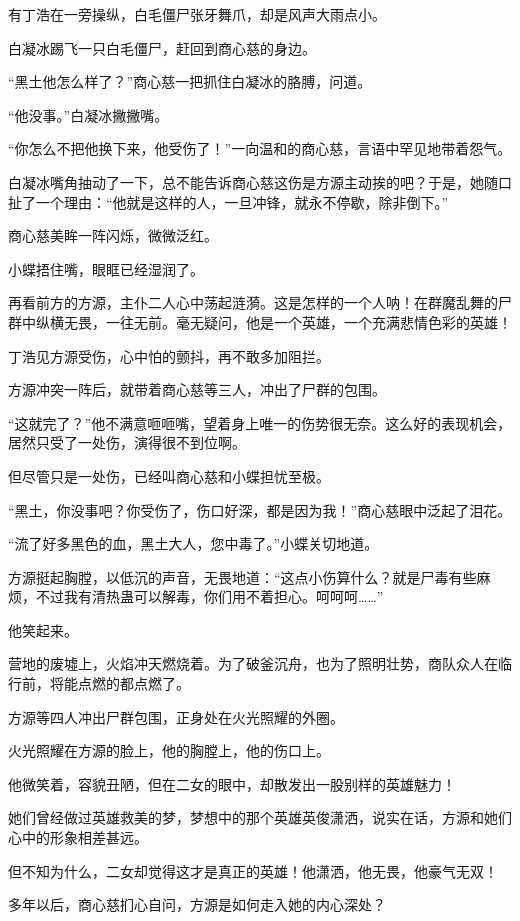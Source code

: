 \begin{this_body}
有丁浩在一旁操纵，白毛僵尸张牙舞爪，却是风声大雨点小。

白凝冰踢飞一只白毛僵尸，赶回到商心慈的身边。

“黑土他怎么样了？”商心慈一把抓住白凝冰的胳膊，问道。

“他没事。”白凝冰撇撇嘴。

“你怎么不把他换下来，他受伤了！”一向温和的商心慈，言语中罕见地带着怨气。

白凝冰嘴角抽动了一下，总不能告诉商心慈这伤是方源主动挨的吧？于是，她随口扯了一个理由：“他就是这样的人，一旦冲锋，就永不停歇，除非倒下。”

商心慈美眸一阵闪烁，微微泛红。

小蝶捂住嘴，眼眶已经湿润了。

再看前方的方源，主仆二人心中荡起涟漪。这是怎样的一个人呐！在群魔乱舞的尸群中纵横无畏，一往无前。毫无疑问，他是一个英雄，一个充满悲情色彩的英雄！

丁浩见方源受伤，心中怕的颤抖，再不敢多加阻拦。

方源冲突一阵后，就带着商心慈等三人，冲出了尸群的包围。

“这就完了？”他不满意咂咂嘴，望着身上唯一的伤势很无奈。这么好的表现机会，居然只受了一处伤，演得很不到位啊。

但尽管只是一处伤，已经叫商心慈和小蝶担忧至极。

“黑土，你没事吧？你受伤了，伤口好深，都是因为我！”商心慈眼中泛起了泪花。

“流了好多黑色的血，黑土大人，您中毒了。”小蝶关切地道。

方源挺起胸膛，以低沉的声音，无畏地道：“这点小伤算什么？就是尸毒有些麻烦，不过我有清热蛊可以解毒，你们用不着担心。呵呵呵……”

他笑起来。

营地的废墟上，火焰冲天燃烧着。为了破釜沉舟，也为了照明壮势，商队众人在临行前，将能点燃的都点燃了。

方源等四人冲出尸群包围，正身处在火光照耀的外圈。

火光照耀在方源的脸上，他的胸膛上，他的伤口上。

他微笑着，容貌丑陋，但在二女的眼中，却散发出一股别样的英雄魅力！

她们曾经做过英雄救美的梦，梦想中的那个英雄英俊潇洒，说实在话，方源和她们心中的形象相差甚远。

但不知为什么，二女却觉得这才是真正的英雄！他潇洒，他无畏，他豪气无双！

多年以后，商心慈扪心自问，方源是如何走入她的内心深处？


\end{this_body}
